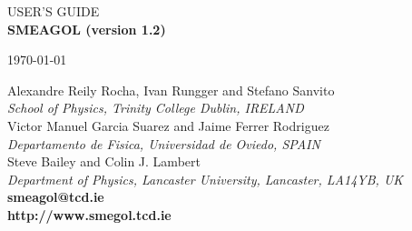 \documentclass[11pt]{article}
\begin{document}
\newcommand{\inputflag}[4]{
\noindent
{\bf #1} ({\textit{#2}}):\\
\begin{tabular}{p{0.3cm}p{15.0cm}}
 &#3\\
\\
 &\textit{Default value}: #4\\
\end{tabular}
\vspace{0.4cm}
}

\newcommand{\filedescription}[2]{
{
\noindent
\filestyle{#1}}:\\
\begin{tabular}{p{0.2cm}p{15.0cm}}
 &#2
\end{tabular}
\vspace{0.4cm}
}
\newcommand{\filestyle}[1]{{\ttfamily #1}}

\pagestyle{empty}
\begin{center}
{\huge U\LARGE{SER'S} \huge G\LARGE{UIDE}}\\
\vspace{3.3cm}
{\Huge \bf SMEAGOL (version 1.2)}\\
\vspace{3.3cm}
\centerline{\large \today}
\vspace{3.3cm}
{{\large Alexandre Reily Rocha, Ivan Rungger and Stefano Sanvito}\\
\textit{School of Physics, Trinity College Dublin, IRELAND}}\\
\vspace{1cm}
{{\large Victor Manuel Garcia Suarez and Jaime Ferrer Rodriguez}\\
\textit{Departamento de Fisica, Universidad de Oviedo, SPAIN}}\\
\vspace{1cm}
{{\large Steve Bailey and Colin J. Lambert}\\
\textit{Department of Physics, Lancaster University, Lancaster, LA14YB, UK}}\\

\vspace{3cm}
\bf smeagol@tcd.ie\\
http://www.smegol.tcd.ie

\end{center}


\newpage

\pagestyle{plain}
\tableofcontents
\newpage
\end{document}
